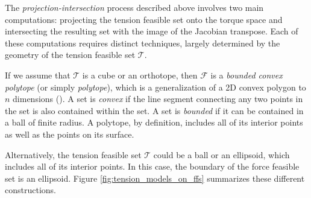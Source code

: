 The \emph{projection-intersection} process described above involves two main computations: projecting the tension feasible set onto the torque space and intersecting the resulting set with the image of the Jacobian transpose. Each of these computations requires distinct techniques, largely determined by the geometry of the tension feasible set $\mathcal{T}$.

If we assume that $\mathcal{T}$ is a cube or an orthotope, then $\mathcal{F}$ is a \emph{bounded convex polytope} (or simply \emph{polytope}), which is a generalization of a 2D convex polygon to $n$ dimensions (\cite{grunbaumConvexPolytopes2013}). A set is \emph{convex} if the line segment connecting any two points in the set is also contained within the set. A set is \emph{bounded} if it can be contained in a ball of finite radius. A polytope, by definition, includes all of its interior points as well as the points on its surface. 

Alternatively, the tension feasible set $\mathcal{T}$ could be a ball or an ellipsoid, which includes all of its interior points. In this case, the boundary of the force feasible set is an ellipsoid. Figure \ref{fig:tension_models_on_ffs} summarizes these different constructions.

